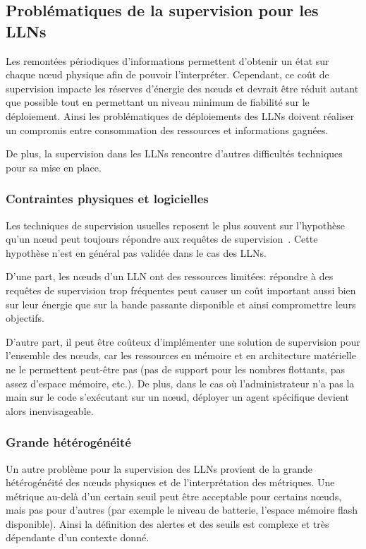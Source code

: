 \subsection{Problématiques de la supervision pour les \ac{LLN}s}

Les remontées périodiques d'informations permettent d'obtenir un état sur chaque nœud physique afin de pouvoir l'interpréter.
Cependant, ce coût de supervision impacte les réserves d'énergie des nœuds et devrait être réduit autant que possible tout en permettant un niveau minimum de fiabilité sur le déploiement.
Ainsi les problématiques de déploiements des \ac{LLN}s doivent réaliser un compromis entre consommation des ressources et informations gagnées.

De plus, la supervision dans les \ac{LLN}s rencontre d'autres difficultés techniques pour sa mise en place.

\subsubsection{Contraintes physiques et logicielles}

Les techniques de supervision usuelles reposent le plus souvent sur l'hypothèse qu'un nœud peut toujours répondre aux requêtes de supervision~\cite{ward2014observing}.
Cette hypothèse n'est en général pas validée dans le cas des \ac{LLN}s.

D'une part, les nœuds d'un \ac{LLN} ont des ressources limitées: répondre à des requêtes de supervision trop fréquentes peut causer un coût important aussi bien sur leur énergie que sur la bande passante disponible et ainsi compromettre leurs objectifs.

D'autre part, il peut être coûteux d'implémenter une solution de supervision pour l'ensemble des nœuds, car les ressources en mémoire et en architecture matérielle ne le permettent peut-être pas (pas de support pour les nombres flottants, pas assez d'espace mémoire, etc.).
De plus, dans le cas où l'administrateur n'a pas la main sur le code s'exécutant sur un nœud, déployer un agent spécifique devient alors inenvisageable.

\subsubsection{Grande hétérogénéité}

Un autre problème pour la supervision des \ac{LLN}s provient de la grande hétérogénéité des nœuds physiques et de l'interprétation des métriques.
Une métrique au-delà d'un certain seuil peut être acceptable pour certains nœuds, mais pas pour d'autres (par exemple le niveau de batterie, l'espace mémoire flash disponible).
Ainsi la définition des alertes et des seuils est complexe et très dépendante d'un contexte donné.


